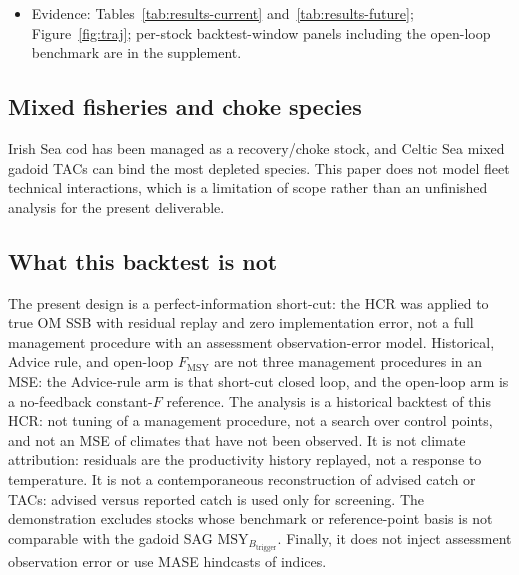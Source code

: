\documentclass[11pt,a4paper]{article}
\newcommand{\Fmsy}{F_{\mathrm{MSY}}}
\newcommand{\Btrig}{\mathrm{MSY}_{B_{\mathrm{trigger}}}}
\newcommand{\Bmsy}{B_{\mathrm{MSY}}}
\begin{document}
\begin{itemize}
        The open-loop check shows the same shortfall for Celtic Sea
        whiting over the backtest window, so this is a scoring result
        under the realised productivity (a single fixed replay), not an
        argument that a different ICES $F$ process would have cleared
        the trigger. The direction can differ elsewhere: regionally,
        median $\Btrig\approx 0.6\,\Bmsy$ \citep{winker2026rebuilding},
        in which case clearing the trigger would not imply that OM
        $\Bmsy$ is met. Either way, the gap between the two yardsticks is
        a property of the OM stock--recruitment relationship (here the
        $R_0$ prior of the reference OM) as much as of the stock, and it
        is the quantity the dual scoring is designed to expose.
  \item Evidence: Tables~\ref{tab:results-current}
        and~\ref{tab:results-future}; Figure~\ref{fig:traj}; per-stock
        backtest-window panels including the open-loop benchmark are in
        the supplement.
\end{itemize}

\subsection{Mixed fisheries and choke species}
Irish Sea cod has been managed as a recovery/choke stock, and Celtic Sea
mixed gadoid TACs can bind the most depleted species. This paper does
not model fleet technical interactions, which is a limitation of scope
rather than an unfinished analysis for the present deliverable.

\subsection{What this backtest is not}
The present design is a perfect-information short-cut: the HCR was
applied to true OM SSB with residual replay and zero implementation
error, not a full management procedure with an assessment
observation-error model. Historical, Advice rule, and open-loop
$\Fmsy$ are not three management procedures in an MSE: the Advice-rule
arm is that short-cut closed loop, and the open-loop arm is a
no-feedback constant-$F$ reference. The analysis is a historical
backtest of this HCR: not tuning of a management procedure, not a search
over control points, and not an MSE of climates that have not been
observed. It is not climate attribution: residuals are the productivity
history replayed, not a response to temperature. It is not a
contemporaneous reconstruction of advised catch or TACs: advised versus
reported catch is used only for screening. The demonstration excludes
stocks whose benchmark or reference-point basis is not comparable with
the gadoid SAG $\Btrig$. Finally, it does not inject assessment
observation error or use MASE hindcasts of indices.
\end{document}
